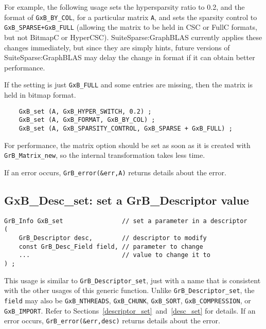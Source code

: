 \documentclass[12pt]{article}
\begin{document}
For example, the following usage sets the hypersparsity ratio to 0.2, and the
format of \verb'GxB_BY_COL', for a particular matrix \verb'A', and sets the
sparsity control to \verb'GxB_SPARSE+GxB_FULL' (allowing the matrix to be held
in CSC or FullC formats, but not BitmapC or HyperCSC).  SuiteSparse:GraphBLAS
currently applies these changes immediately, but since they are simply hints,
future versions of SuiteSparse:GraphBLAS may delay the change in format if it
can obtain better performance.

If the setting is just \verb'GxB_FULL' and some entries are missing, then
the matrix is held in bitmap format.

{\footnotesize
\begin{verbatim}
    GxB_set (A, GxB_HYPER_SWITCH, 0.2) ;
    GxB_set (A, GxB_FORMAT, GxB_BY_COL) ;
    GxB_set (A, GxB_SPARSITY_CONTROL, GxB_SPARSE + GxB_FULL) ;
\end{verbatim} }

For performance, the matrix option should be set as soon as it is created with
\verb'GrB_Matrix_new', so the internal transformation takes less time.

If an error occurs, \verb'GrB_error(&err,A)' returns details about the error.

\subsection{{\sf GxB\_Desc\_set:} set a {\sf GrB\_Descriptor} value}
\label{gxbset}

\begin{mdframed}[userdefinedwidth=6in]
{\footnotesize
\begin{verbatim}
GrB_Info GxB_set                // set a parameter in a descriptor
(
    GrB_Descriptor desc,        // descriptor to modify
    const GrB_Desc_Field field, // parameter to change
    ...                         // value to change it to
) ;
\end{verbatim} } \end{mdframed}

This usage is similar to \verb'GrB_Descriptor_set', just with a name that is
consistent with the other usages of this generic function.  Unlike
\verb'GrB_Descriptor_set', the \verb'field' may also be \verb'GxB_NTHREADS',
\verb'GxB_CHUNK', \verb'GxB_SORT', \verb'GxB_COMPRESSION', or
\verb'GxB_IMPORT'.  Refer to Sections~\ref{descriptor_set}~and~\ref{desc_set}
for details.  If an error occurs, \verb'GrB_error(&err,desc)' returns details
about the error.
\end{document}
